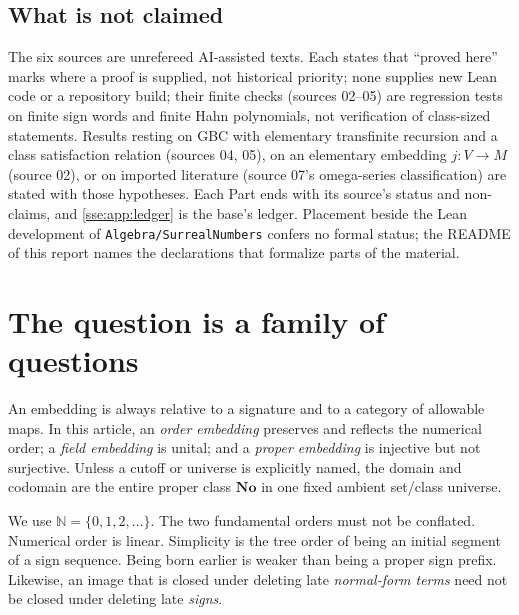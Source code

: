 \documentclass[11pt,a4paper]{article}
\numberwithin{equation}{section}
\theoremstyle{plain}
\theoremstyle{definition}
\theoremstyle{remark}
\newcommand{\No}{\mathbf{No}}
\newcommand{\N}{\mathbb{N}}
\newcommand{\fn}[1]{\nolinkurl{#1}}%
\begin{document}
\subsection{What is not claimed}\label{sse:sec:nonclaims}
The six sources are unrefereed AI-assisted texts. Each states that
``proved here'' marks where a proof is supplied, not historical priority;
none supplies new Lean code or a repository build; their finite checks
(sources 02--05) are regression tests on finite sign words and finite Hahn
polynomials, not verification of class-sized statements. Results resting on
GBC with elementary transfinite recursion and a class satisfaction relation
(sources 04, 05), on an elementary embedding $j:V\to M$ (source 02), or on
imported literature (source 07's omega-series classification) are stated
with those hypotheses. Each Part ends with its source's status and
non-claims, and \cref{sse:app:ledger} is the base's ledger. Placement beside
the Lean development of \fn{Algebra/SurrealNumbers} confers no formal status;
the README of this report names the declarations that formalize parts of
the material.
\section{The question is a family of questions}\label{sse:sec:scope}

An embedding is always relative to a signature and to a category of
allowable maps. In this article, an \emph{order embedding} preserves and
reflects the numerical order; a \emph{field embedding} is unital; and a
\emph{proper embedding} is injective but not surjective. Unless a cutoff or
universe is explicitly named, the domain and codomain are the entire
proper class $\No$ in one fixed ambient set/class universe.

We use $\N=\{0,1,2,\ldots\}$.
The two fundamental orders must not be conflated. Numerical order is
linear. Simplicity is the tree order of being an initial segment of a sign
sequence. Being born earlier is weaker than being a proper sign prefix.
Likewise, an image that is closed under deleting late \emph{normal-form
terms} need not be closed under deleting late \emph{signs}.
\end{document}
